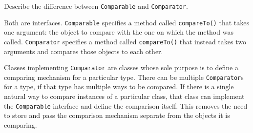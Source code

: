 Describe the difference between \texttt{Comparable} and \texttt{Comparator}. \\
\begin{answer}
Both are interfaces.
\texttt{Comparable} specifies a method called \texttt{compareTo()} that takes one argument: the object to compare with the one on which the method was called.
\texttt{Comparator} specifies a method called \texttt{compareTo()} that instead takes two arguments and compares those objects to each other.

Classes implementing \texttt{Comparator} are classes whose sole purpose is to define a comparing mechanism for a particular type. There can be multiple \texttt{Comparator}s for a type, if that type has multiple ways to be compared. If there is a single natural way to compare instances of a particular class, that class can implement the \texttt{Comparable} interface and define the comparison itself. This removes the need to store and pass the comparison mechanism separate from the objects it is comparing.
\end{answer}

